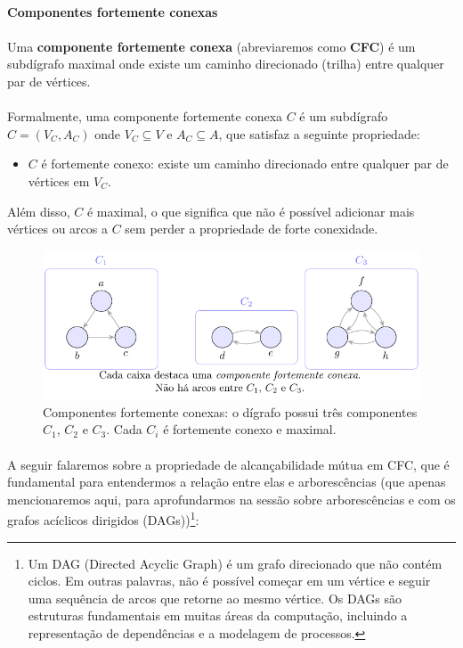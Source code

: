 \documentclass[12pt,a4paper]{article}
\def\emph#1{#1}%
\begin{document}
\paragraph{Componentes fortemente conexas}
\paragraph{}Uma \textbf{componente fortemente conexa} (abreviaremos como \textbf{CFC}) é um subdígrafo maximal onde existe um caminho direcionado (trilha) entre qualquer par de vértices. 

\paragraph{}
Formalmente, uma componente fortemente conexa \(C\) é um subdígrafo \(C = (V_C, A_C)\) onde \(V_C \subseteq V\) e \(A_C \subseteq A\), que satisfaz a seguinte propriedade:
\begin{itemize}
    \item \(C\) é fortemente conexo: existe um caminho direcionado entre qualquer par de vértices em \(V_C\).
\end{itemize}
Além disso, \(C\) é maximal, o que significa que não é possível adicionar mais vértices ou arcos a \(C\) sem perder a propriedade de forte conexidade.

\begin{figure}[H]
    \centering
    \includegraphics[width=0.9\linewidth]{figures/figure_028.pdf}

    \caption{Componentes fortemente conexas: o dígrafo possui três componentes $C_1$, $C_2$ e $C_3$. Cada $C_i$ é fortemente conexo e \emph{maximal}.}
    \end{figure}


\paragraph{}
A seguir falaremos sobre a propriedade de alcançabilidade mútua em CFC, que é fundamental para entendermos a relação entre elas e arborescências (que apenas mencionaremos aqui, para aprofundarmos na sessão sobre arborescências e com os grafos acíclicos dirigidos (DAGs))\footnote{Um DAG (Directed Acyclic Graph) é um grafo direcionado que não contém ciclos. Em outras palavras, não é possível começar em um vértice e seguir uma sequência de arcos que retorne ao mesmo vértice. Os DAGs são estruturas fundamentais em muitas áreas da computação, incluindo a representação de dependências e a modelagem de processos.}:
\end{document}
